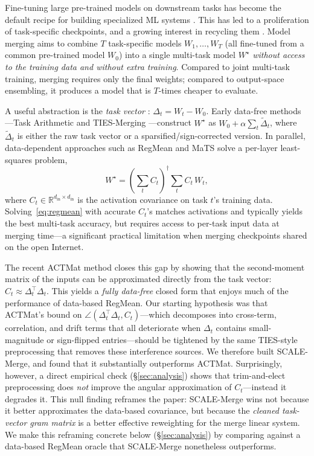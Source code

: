 \documentclass{article} %
\newcommand{\ws}{W^\star}
\begin{document}
Fine-tuning large pre-trained models on downstream tasks has become the default recipe for building specialized ML systems \citep{devlin2019bert,dosovitskiy2021image}. This has led to a proliferation of task-specific checkpoints, and a growing interest in recycling them \citep{wortsman2022model,ilharco2023editing}. Model merging \citep{matena2022merging,wortsman2022model,ilharco2023editing} aims to combine $T$ task-specific models $W_1,\ldots,W_T$ (all fine-tuned from a common pre-trained model $W_0$) into a single multi-task model $\ws$ \emph{without access to the training data and without extra training}. Compared to joint multi-task training, merging requires only the final weights; compared to output-space ensembling, it produces a model that is $T$-times cheaper to evaluate.

A useful abstraction is the \emph{task vector} \citep{ilharco2023editing}: $\Delta_t = W_t - W_0$. Early data-free methods---Task Arithmetic \citep{ilharco2023editing} and TIES-Merging \citep{yadav2023tiesmerging}---construct $\ws$ as $W_0 + \alpha \sum_t \tilde\Delta_t$, where $\tilde\Delta_t$ is either the raw task vector or a sparsified/sign-corrected version. In parallel, data-dependent approaches such as RegMean \citep{jin2023dataless} and MaTS \citep{tam2024mats} solve a per-layer least-squares problem,
\begin{equation}
\ws = \left(\sum_t C_t\right)^{\dagger} \sum_t C_t\, W_t,
\label{eq:regmean}
\end{equation}
where $C_t \in \mathbb{R}^{d_{\text{in}} \times d_{\text{in}}}$ is the activation covariance on task $t$'s training data. Solving~\eqref{eq:regmean} with accurate $C_t$'s matches activations and typically yields the best multi-task accuracy, but requires access to per-task input data at merging time---a significant practical limitation when merging checkpoints shared on the open Internet.

The recent ACTMat method \citep{hameed2025actmat} closes this gap by showing that the second-moment matrix of the inputs can be approximated directly from the task vector: $C_t \approx \Delta_t^\top \Delta_t$. This yields a \emph{fully data-free} closed form that enjoys much of the performance of data-based RegMean. Our starting hypothesis was that ACTMat's bound on $\angle(\Delta_t^\top \Delta_t, C_t)$---which decomposes into cross-term, correlation, and drift terms that all deteriorate when $\Delta_t$ contains small-magnitude or sign-flipped entries---should be tightened by the same TIES-style preprocessing \citep{yadav2023tiesmerging} that removes these interference sources. We therefore built SCALE-Merge, and found that it substantially outperforms ACTMat. Surprisingly, however, a direct empirical check (\S\ref{sec:analysis}) shows that trim-and-elect preprocessing does \emph{not} improve the angular approximation of $C_t$---instead it degrades it. This null finding reframes the paper: SCALE-Merge wins not because it better approximates the data-based covariance, but because the \emph{cleaned task-vector gram matrix} is a better effective reweighting for the merge linear system. We make this reframing concrete below (\S\ref{sec:analysis}) by comparing against a data-based RegMean oracle that SCALE-Merge nonetheless outperforms.
\end{document}
